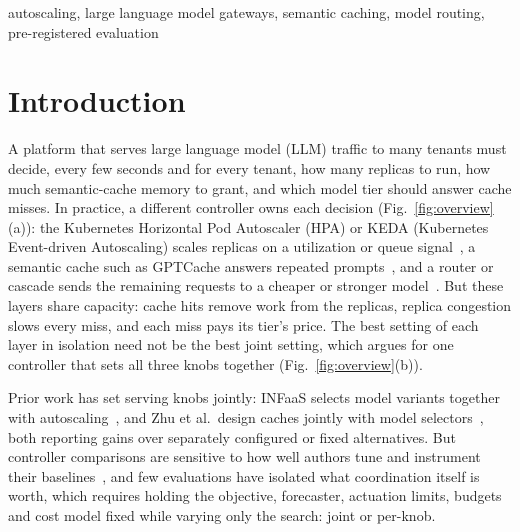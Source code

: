 \documentclass[conference,a4paper]{IEEEtran}
\begin{document}
\begin{IEEEkeywords}
autoscaling, large language model gateways, semantic caching, model routing,
pre-registered evaluation
\end{IEEEkeywords}

\section{Introduction}

A platform that serves large language model (LLM) traffic to many tenants
must decide, every few seconds and for every tenant, how many replicas to
run, how much semantic-cache memory to grant, and which model tier should
answer cache misses. In practice, a different controller owns each
decision (Fig.~\ref{fig:overview}(a)): the Kubernetes Horizontal Pod
Autoscaler (HPA) or KEDA (Kubernetes Event-driven Autoscaling) scales
replicas on a utilization or queue signal~\cite{k8shpa,keda}, a semantic
cache such as GPTCache answers repeated prompts~\cite{gptcache}, and a
router or cascade sends the remaining requests to a cheaper or stronger
model~\cite{frugalgpt}. But these layers share capacity: cache hits remove
work from the replicas, replica congestion slows every miss, and each miss
pays its tier's price. The best setting of each layer in isolation need not
be the best joint setting, which argues for one controller that sets all
three knobs together (Fig.~\ref{fig:overview}(b)).

Prior work has set serving knobs jointly: INFaaS selects model variants
together with autoscaling~\cite{infaas}, and Zhu et al.\ design caches
jointly with model selectors~\cite{zhu2023}, both reporting gains over
separately configured or fixed alternatives. But controller comparisons are
sensitive to how well authors tune and instrument their
baselines~\cite{chameleon,zhang2026drl,khilji2026}, and few evaluations
have isolated what coordination itself is worth, which requires holding the
objective, forecaster, actuation limits, budgets and cost model fixed while
varying only the search: joint or per-knob.
\end{document}
